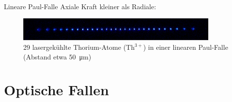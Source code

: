 \documentclass[12pt]{beamer}
\begin{document}
\begin{frame}{Lineare Paul-Falle}
Axiale Kraft kleiner als Radiale:
\begin{figure}[h]
	\centering
	\includegraphics[width=0.9\textwidth]{./figures/29_laser_cooled_ion_chain.jpg}
	\caption{29 lasergekühlte Thorium-Atome ($\mathrm{Th}^{3+}$) in einer linearen Paul-Falle (Abstand etwa \SI{50}{\micro\metre}) \cite{campbell}}
\end{figure}

\end{frame}

\section{Optische Fallen}
\end{document}
